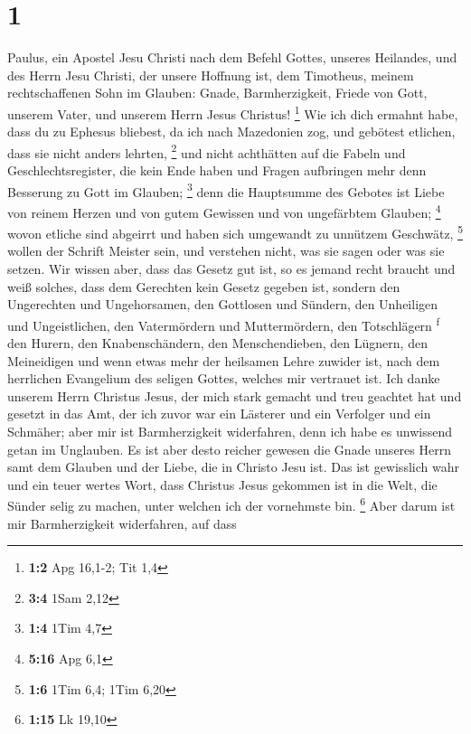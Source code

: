 \hypertarget{section}{%
\section{1}\label{section}}

 Paulus, ein Apostel Jesu Christi nach dem Befehl Gottes,
unseres Heilandes, und des Herrn Jesu Christi, der unsere Hoffnung ist,
 dem Timotheus, meinem rechtschaffenen Sohn im Glauben:
Gnade, Barmherzigkeit, Friede von Gott, unserem Vater, und unserem Herrn
Jesus Christus! \footnote{\textbf{1:2} Apg 16,1-2; Tit 1,4}
 Wie ich dich ermahnt habe, dass du zu Ephesus bliebest,
da ich nach Mazedonien zog, und gebötest etlichen, dass sie nicht anders
lehrten, \footnote{\textbf{3:4} 1Sam 2,12}  und nicht
achthätten auf die Fabeln und Geschlechtsregister, die kein Ende haben
und Fragen aufbringen mehr denn Besserung zu Gott im Glauben;
\footnote{\textbf{1:4} 1Tim 4,7}  denn die Hauptsumme des
Gebotes ist Liebe von reinem Herzen und von gutem Gewissen und von
ungefärbtem Glauben; \footnote{\textbf{5:16} Apg 6,1} 
wovon etliche sind abgeirrt und haben sich umgewandt zu unnützem
Geschwätz, \footnote{\textbf{1:6} 1Tim 6,4; 1Tim 6,20} 
wollen der Schrift Meister sein, und verstehen nicht, was sie sagen oder
was sie setzen.  Wir wissen aber, dass das Gesetz gut ist,
so es jemand recht braucht  und weiß solches, dass dem
Gerechten kein Gesetz gegeben ist, sondern den Ungerechten und
Ungehorsamen, den Gottlosen und Sündern, den Unheiligen und
Ungeistlichen, den Vatermördern und Muttermördern, den Totschlägern
\textsuperscript{f}  den Hurern, den Knabenschändern, den
Menschendieben, den Lügnern, den Meineidigen und wenn etwas mehr der
heilsamen Lehre zuwider ist,  nach dem herrlichen
Evangelium des seligen Gottes, welches mir vertrauet ist.
 Ich danke unserem Herrn Christus Jesus, der mich stark
gemacht und treu geachtet hat und gesetzt in das Amt, 
der ich zuvor war ein Lästerer und ein Verfolger und ein Schmäher; aber
mir ist Barmherzigkeit widerfahren, denn ich habe es unwissend getan im
Unglauben.  Es ist aber desto reicher gewesen die Gnade
unseres Herrn samt dem Glauben und der Liebe, die in Christo Jesu ist.
 Das ist gewisslich wahr und ein teuer wertes Wort, dass
Christus Jesus gekommen ist in die Welt, die Sünder selig zu machen,
unter welchen ich der vornehmste bin. \footnote{\textbf{1:15} Lk 19,10}
 Aber darum ist mir Barmherzigkeit widerfahren, auf dass
